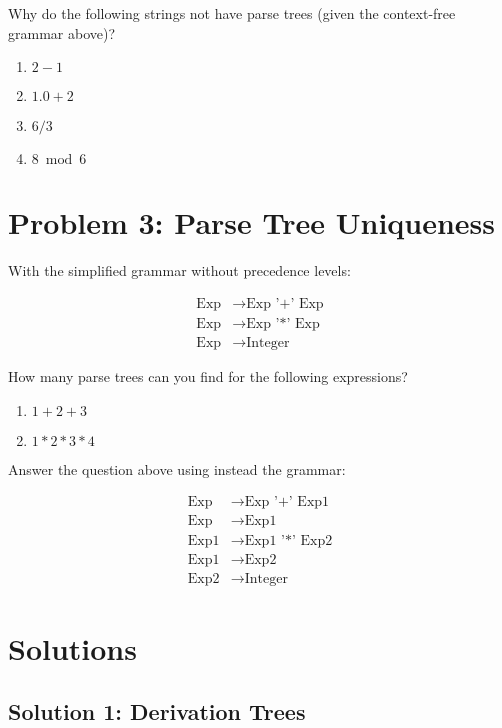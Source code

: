 \documentclass{article}
\theoremstyle{plain}
\theoremstyle{definition}
\theoremstyle{remark}
\begin{document}
Why do the following strings not have parse trees (given the context-free grammar above)?

\begin{enumerate}[label=(\alph*)]
    \item $2-1$
    \item $1.0+2$
    \item $6/3$
    \item $8 \bmod 6$
\end{enumerate}

\section{Problem 3: Parse Tree Uniqueness}

With the simplified grammar without precedence levels:

\begin{align}
\text{Exp} &\to \text{Exp '+' Exp} \\
\text{Exp} &\to \text{Exp '*' Exp} \\
\text{Exp} &\to \text{Integer}
\end{align}

How many parse trees can you find for the following expressions?

\begin{enumerate}[label=(\alph*)]
    \item $1+2+3$
    \item $1*2*3*4$
\end{enumerate}

Answer the question above using instead the grammar:

\begin{align}
\text{Exp} &\to \text{Exp '+' Exp1} \\
\text{Exp} &\to \text{Exp1} \\
\text{Exp1} &\to \text{Exp1 '*' Exp2} \\
\text{Exp1} &\to \text{Exp2} \\
\text{Exp2} &\to \text{Integer}
\end{align}

\section{Solutions}

\subsection{Solution 1: Derivation Trees}
\end{document}
